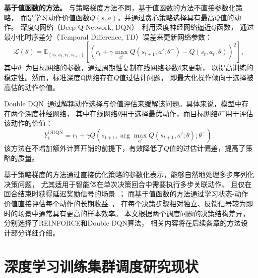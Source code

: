 \textbf{基于值函数的方法。}
与策略梯度方法不同，基于值函数的方法不直接参数化策略，
而是学习动作价值函数$Q\left(s, a\right)$，并通过贪心策略选择具有最高$Q$值的动作。
深度Q网络（Deep Q-Network, DQN）~\cite{mnih2013playing}利用深度神经网络逼近$Q$函数，
通过最小化时序差分（Temporal Difference, TD）误差来更新网络参数：
\begin{equation}\label{eq:dqn-loss}
    \mathcal{L}\left(\theta\right) = \mathbb{E}_{\left(s_t, a_t, r_t, s_{t+1}\right)} \left[ \left( r_t + \gamma \max_{a'} Q\left(s_{t+1}, a'; \theta^-\right) - Q\left(s_t, a_t; \theta\right) \right)^2 \right],
\end{equation}
其中$\theta^-$为目标网络的参数，通过周期性复制在线网络参数$\theta$来更新，
以提高训练的稳定性。然而，标准深度Q网络存在$Q$值过估计问题，
即最大化操作倾向于选择被高估的动作价值。

Double DQN~\cite{van2016deep}通过解耦动作选择与价值评估来缓解该问题。具体来说，模型中存在两个深度神经网络，
其中在线网络$\theta$用于选择最优动作，而目标网络$\theta^-$用于评估该动作的价值：
\begin{equation}\label{eq2:ddqn-target}
    Y_t^{\text{DDQN}} = r_t + \gamma Q\left(s_{t+1}, \arg\max_{a'} Q\left(s_{t+1}, a'; \theta\right); \theta^-\right).
\end{equation}
该方法在不增加额外计算开销的前提下，有效降低了$Q$值的过估计偏差，提高了策略的质量。

基于策略梯度的方法通过直接优化策略的参数化表示，能够自然地处理多步序列化决策问题，
尤其适用于智能体在单次决策回合中需要执行多步关联动作、
且仅在回合结束时获得延迟奖励信号的场景~\cite{sutton1999policy}；
而基于值函数的方法通过学习状态-动作价值直接评估每个动作的长期收益~\cite{mnih2013playing}，
在每个决策步骤相对独立、反馈信号较为即时的场景中通常具有更高的样本效率。
本文根据两个调度问题的决策结构差异，分别选择了REINFORCE和Double DQN算法，
相关内容将在后续各章的方法设计部分详细介绍。

\section{深度学习训练集群调度研究现状}\label{sec:dl-sched-survey}


